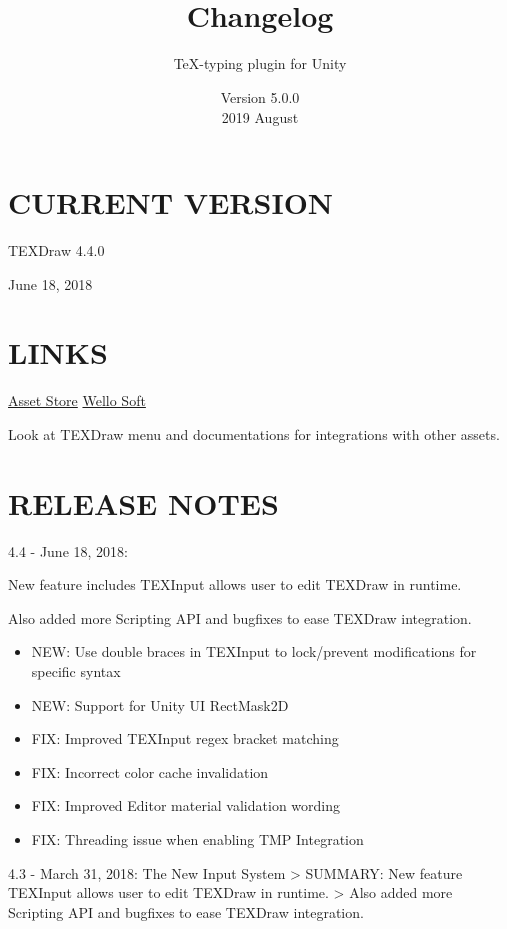 \documentclass[12pt]{article}
\title{\TEXDraw\\ Changelog}
\subtitle{\TeX-typing plugin for Unity}
\date{Version 5.0.0\\2019 August}
\begin{document}
	\maketitle
	
\section{CURRENT VERSION} 

TEXDraw 4.4.0

June 18, 2018

\section{LINKS} 

\href{http://u3d.as/mFe}{Asset Store} 
\href{https://wellosoft.net}{Wello Soft} 

Look at TEXDraw menu and documentations for integrations with other assets.

\section{RELEASE NOTES}

4.4 - June 18, 2018: 

New feature includes TEXInput allows user to edit TEXDraw in runtime.

Also added more Scripting API and bugfixes to ease TEXDraw integration.

\begin{itemize}
\item NEW: Use double braces in TEXInput to lock/prevent modifications for specific syntax
\item NEW: Support for Unity UI RectMask2D
\item FIX: Improved TEXInput regex bracket matching
\item FIX: Incorrect color cache invalidation
\item FIX: Improved Editor material validation wording
\item FIX: Threading issue when enabling TMP Integration
\end{itemize}

4.3 - March 31, 2018: The New Input System
> SUMMARY: New feature TEXInput allows user to edit TEXDraw in runtime.
> Also added more Scripting API and bugfixes to ease TEXDraw integration.
\end{document}
